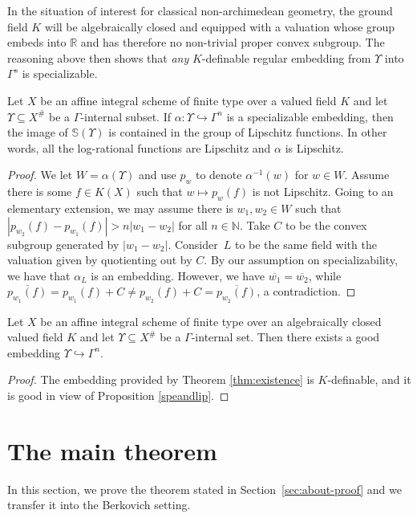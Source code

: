 \documentclass[JEP,XML,SOM,Unicode,ThmDefs,NoEqCountersInSection,published]{cedram}
\newcommand{\N}{\mathbb N}
\newcommand{\R}{\mathbb R}
\renewcommand{\SS}{\mathbb S}
\theoremstyle{plain}
\theoremstyle{definition}
\begin{document}
\begin{rema}
In the situation of interest for classical non-archimedean geometry, the ground field $K$ will be algebraically closed and equipped
with a valuation whose group embeds into $\R$ and has therefore no non-trivial proper convex subgroup. The reasoning above then shows
that \textit{any} $K$-definable regular embedding from $\Upsilon$ into $\Gamma^s$ is specializable.
\end{rema}

\begin{prop}\label{speandlip}
Let $X$ be an affine integral scheme of finite type over a valued field $K$ and let $\Upsilon\subseteq X^{\#}$ be a $\Gamma$-internal subset. If $\alpha:\Upsilon\hookrightarrow \Gamma^n$ is a specializable embedding, then the image of $\SS(\Upsilon)$ is contained in the group of Lipschitz functions. In other words, all the log-rational functions are Lipschitz and $\alpha$ is Lipschitz.
\end{prop}
\begin{proof}
We let $W=\alpha(\Upsilon)$ and use $p_w$ to denote $\alpha^{-1}(w)$ for $w\in W$. Assume there is some $f\in K(X)$ such that $w\mapsto p_w(f)$ is not Lipschitz. Going to an elementary extension, we may assume there is $w_1,w_2 \in W$ such that $|p_{w_2}(f)-p_{w_1}(f)|>n|w_1-w_2|$ for all $n\in \N$. Take $C$ to be the convex subgroup generated by $|w_1-w_2|$. Consider~$L$ to be the same field with the valuation given by quotienting out by $C$. By our assumption on specializability, we have that $\alpha_L$ is an embedding. However, we have
$\overline{w_1}=\overline{w_2}$, while $\overline{p_{w_1}(f)}=p_{w_1}(f)+C\neq p_{w_2}(f)+C=\overline{p_{w_2}(f)}$, a contradiction.
\end{proof}

\begin{coro}\label{goodexistence}
Let $X$ be an affine integral scheme of finite type over an algebraically closed valued field $K$ and let $\Upsilon\subseteq X^{\#}$ be a $\Gamma$-internal set.
Then there exists a good embedding $\Upsilon \hookrightarrow \Gamma^n$.
\end{coro}

\begin{proof}
The embedding provided by
Theorem \ref{thm:existence}
is $K$-definable, and it is good in view of
Proposition \ref{speandlip}.
\end{proof}

\section{The main theorem}
In this section, we prove the theorem stated in Section~\ref{sec:about-proof} and we transfer it into the Berkovich setting.
\end{document}
